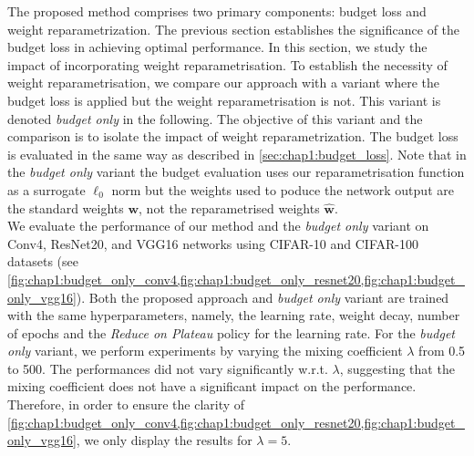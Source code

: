 
The proposed method comprises two primary components: budget loss and weight
reparametrization. The previous section establishes the significance of the
budget loss in achieving optimal performance. In this section, we study the
impact of incorporating weight reparametrisation. To establish the necessity of
weight reparametrisation, we compare our approach with a variant where the
budget loss is applied but the weight reparametrisation is not. This variant is
denoted \emph{budget only} in the following. The objective of this variant and
the comparison is to isolate the impact of weight reparametrization. The budget
loss is evaluated in the same way as described in \cref{sec:chap1:budget_loss}.
Note that in the \emph{budget only} variant the budget evaluation uses our
reparametrisation function as a surrogate $\ell_0$ norm but the weights used to
poduce the network output are the standard weights $\mathbf{w}$, not the
reparametrised weights $\mathbf{\hat{w}}$.\\

We evaluate the performance of our method and the \emph{budget only} variant on
Conv4, ResNet20, and VGG16 networks using CIFAR-10 and CIFAR-100 datasets (see
\cref{fig:chap1:budget_only_conv4,fig:chap1:budget_only_resnet20,fig:chap1:budget_only_vgg16}).
Both the proposed approach and \emph{budget only} variant are trained with the
same hyperparameters, namely, the learning rate, weight decay, number of epochs
and the \emph{Reduce on Plateau} policy for the learning rate. For the
\textit{budget only} variant,  we perform
experiments by varying the mixing coefficient $\lambda$ from 0.5 to 500. The
performances did not vary significantly w.r.t. $\lambda$, suggesting that the
mixing coefficient does not have a significant impact on the performance.
Therefore, in order to ensure the clarity of
\cref{fig:chap1:budget_only_conv4,fig:chap1:budget_only_resnet20,fig:chap1:budget_only_vgg16},
we only display the results for $\lambda = 5$.\\

